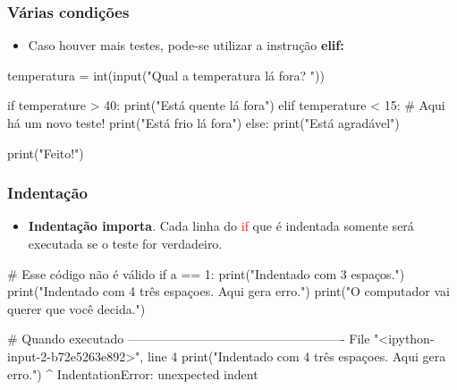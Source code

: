 \documentclass{beamer}
\begin{document}
\begin{frame}[fragile]
 \frametitle{Várias condições}
 
 \begin{itemize}
  \vfill \item Caso houver mais testes, pode-se utilizar a instrução \textbf{elif:}
 \end{itemize}

  
\vfill \begin{python}
temperatura = int(input("Qual a temperatura lá fora? "))

if temperature > 40:
    print("Está quente lá fora")
elif temperature < 15:          # Aqui há um novo teste!
    print("Está frio lá fora")
else:
    print("Está agradável")
    
print("Feito!")
\end{python} 
\end{frame}




\begin{frame}[fragile]
\frametitle{Indentação}

\begin{itemize}
 \vfill \item \textbf{Indentação importa}. Cada linha do \textcolor{red}{if} que é indentada somente será executada se o teste for verdadeiro.
\end{itemize}

\vfill \begin{python}
# Esse código não é válido
if a == 1:
  print("Indentado com 3 espaços.")
    print("Indentado com 4 três espaçoes. Aqui gera erro.")
   print("O computador vai querer que você decida.")

# Quando executado ----------------------------------------------------   
File "<ipython-input-2-b72e5263e892>", line 4
    print("Indentado com 4 três espaçoes. Aqui gera erro.")
    ^
IndentationError: unexpected indent   
\end{python}
\end{frame}
\end{document}
